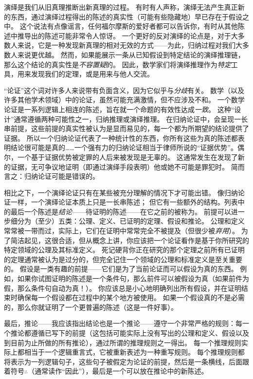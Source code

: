 演绎是我们从旧真理推断出新真理的过程。
有时有人声称，演绎无法产生真正新的东西，通过演绎过程得出的陈述的真实性（可能有些隐藏地）早已存在于假设之中。
这个说法有点像谣言，任何福尔摩斯的爱好者都可以告诉你，有时从其他陈述中推导出的陈述可能非常令人惊讶。
一个更好的反对演绎的论点是，对于大多数人来说，它是一种发现新真理的相对无效的方式——为此，归纳过程对我们大多数人来说更优越。
然而，如果能展示一条从已知假设到特定结论的演绎推理链，那么这个结论的真实性是\emph{不容置疑}的。
因此，数学家们将演绎推理作为\emph{特定}工具，用来发现我们的定理，或是用来与他人交流。

“论证”这个词对许多人来说带有负面含义，因为它似乎与{\em 分歧}有关。
数学（以及许多其他学术领域）中的论证，虽然可能充满激情，但不应涉及不和。
一个数学论证是一系列逻辑上相连的陈述，旨在就一个命题的有效性达成{\em 一致}。
这种“设计”通常遵循两种可能性之一，归纳推理或演绎推理。
在归纳论证中，会呈现一长串前提，这些前提的真实性被认为是显而易见的，每一个都为所期望的结论提供了证据。
所以一个归纳论证代表了一种统计性的东西，你所有这些为真的陈述都表明结论很可能是真的……一个强有力的归纳论证相当于律师所说的“证据优势”。偶尔，一个基于证据优势被定罪的人后来被发现是无辜的。
这通常发生在发现了新的证据，无可争议地证明（即通过演绎手段表明）他或她不可能是罪犯时。
简而言之：归纳论证可能是错误的。

相比之下，一个演绎论证只有在某些被充分理解的情况下才可能出错。
像归纳论证一样，一个演绎论证本质上只是一长串陈述；
但它有一些额外的结构。列表中的最后一个陈述是{\em 结论}——待证明的陈述——在它之前的被称为。
前提可以进一步细分为（至少）五类：公理、定义、已证明的定理、假设和推论。
公理和定义常常被一带而过，实际上，它们在证明中常常完全不被提及（但很少被{\em 弃用}）。
为了简洁起见，这很合适，但从概念上讲，你应该把一个论证看作是基于你所研究的特定领域的公理及其标准定义。
死记硬背你正在研究的那个定理之前所有已证明的定理通常被认为是过分的，但完全记住一个领域的公理和标准定义是至关重要的。
假设是一类有趣的前提——它们是为了当前论证而可以假设为真的东西。
例如，如果你试图证明的陈述是一个条件句，那么前件可以被假设为真（如果前件为假，那么条件句自动为真！）。
你应该总是小心地明确列出所有假设，并在证明结束时确保每一个假设都在过程中的某个地方被使用。
如果一个假设真的不是必需的，那么你就证明了一个更普遍的陈述（这是一件好事）。

最后，推论——我应该指出结论也是一个推论——遵守一个非常严格的规则：每一个推论都遵循已写下的前提（这包括可能实际上没有写出的公理和定义、假设以及到目前为止所做的所有推论），通过所谓的推理规则之一得出。
每一个推理规则实际上都相当于一个逻辑重言式，它被重新表述为一种重写规则。
每个推理规则都将表示为一列逻辑句子，这些句子被假定为论证的前提，然后是一条横线，后面跟着符号$\therefore$（通常读作“因此”），最后是一个可以放在推论中的新陈述。

